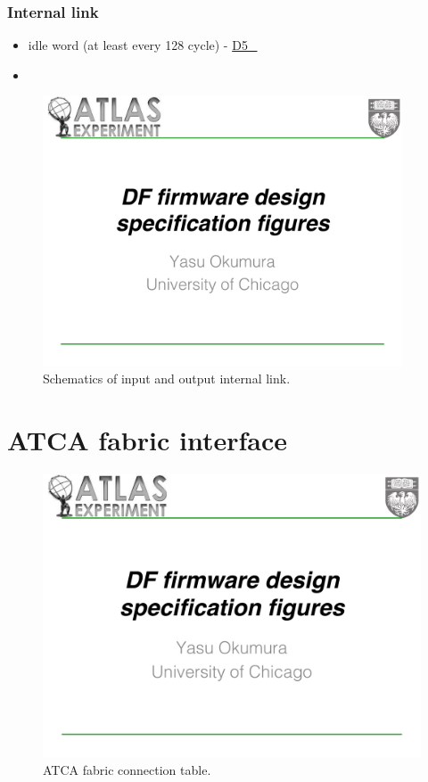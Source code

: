 \documentclass[11pt,letterpaper]{article}
\begin{document}
\subsubsection{Internal link}
\begin{itemize}
\item idle word (at least every 128 cycle) - \url{D5_}
\item 
\end{itemize}

\begin{figure}[h!]
  \centering
  \includegraphics[width=0.95\textwidth,clip,page=12]{figures.pdf}
  \caption{Schematics of input and output internal link.}
  \label{fig:EVENT_INTERNALINK_INOUT}
\end{figure}

\appendix

\section{ATCA fabric interface}
\begin{figure}[h!]
  \centering
  \includegraphics[width=1.0\textwidth,clip,page=13]{figures.pdf}
  \caption{ATCA fabric connection table.}
  \label{fig:ATCAFabricConnectionTable}
\end{figure}
\end{document}
